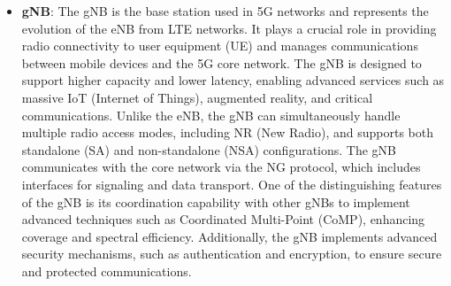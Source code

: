 \documentclass[english]{article}
\begin{document}
\begin{itemize}
	\item \textbf{\hypertarget{gNB}{gNB}}:
	      The gNB is the base station used in 5G networks and represents the evolution of the eNB
	      from LTE networks. It plays a crucial role in providing radio connectivity to user
	      equipment (UE) and manages communications between mobile devices and the 5G core network.
	      The gNB is designed to support higher capacity and lower latency, enabling advanced
	      services such as massive IoT (Internet of Things), augmented reality, and critical communications.
	      Unlike the eNB, the gNB can simultaneously handle multiple radio access modes, including
	      NR (New Radio), and supports both standalone (SA) and non-standalone (NSA) configurations.
	      The gNB communicates with the core network via the NG protocol, which includes interfaces
	      for signaling and data transport. One of the distinguishing features of the gNB is its
	      coordination capability with other gNBs to implement advanced techniques such as
	      Coordinated Multi-Point (CoMP), enhancing coverage and spectral efficiency.
	      Additionally, the gNB implements advanced security mechanisms, such as authentication and
	      encryption, to ensure secure and protected communications.


\end{itemize}
\end{document}
